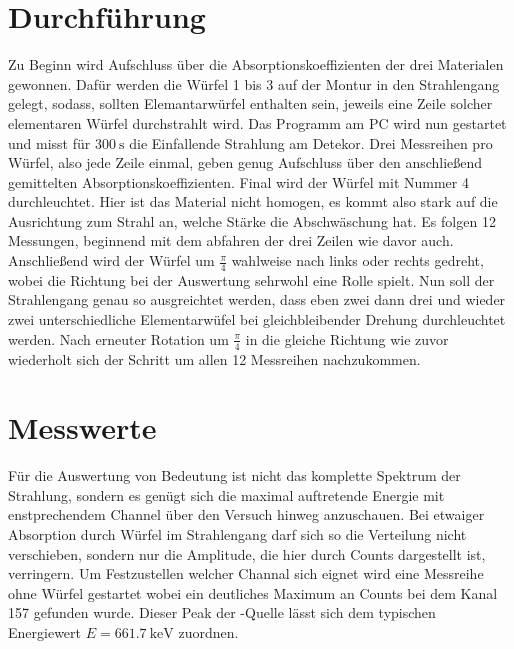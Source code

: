 \section{Durchführung}
Zu Beginn wird Aufschluss über die Absorptionskoeffizienten der drei Materialen gewonnen. 
Dafür werden die Würfel 1 bis 3 auf der Montur in den Strahlengang gelegt, sodass, sollten Elemantarwürfel enthalten sein, jeweils eine Zeile solcher elementaren Würfel 
durchstrahlt wird. Das Programm am PC wird nun gestartet und misst für $\SI{300}{\second}$ die Einfallende Strahlung am Detekor. Drei Messreihen pro Würfel, also jede Zeile einmal, geben genug Aufschluss über den anschließend gemittelten Absorptionskoeffizienten.
Final wird der Würfel mit Nummer 4 durchleuchtet. Hier ist das Material nicht homogen, es kommt also stark auf die Ausrichtung zum Strahl an, welche Stärke
die Abschwäschung hat. Es folgen 12 Messungen, beginnend mit dem abfahren der drei Zeilen wie davor auch. Anschließend wird der Würfel um 
$\frac{\pi}{4}$ wahlweise nach links oder rechts gedreht, wobei die Richtung bei der Auswertung sehrwohl eine Rolle spielt.
Nun soll der Strahlengang genau so ausgreichtet werden, dass eben zwei dann drei und wieder zwei unterschiedliche Elementarwüfel bei gleichbleibender Drehung
durchleuchtet werden. Nach erneuter Rotation um $\frac{\pi}{4}$ in die gleiche Richtung wie zuvor wiederholt sich der Schritt um 
allen 12 Messreihen nachzukommen.

\section{Messwerte}
Für die Auswertung von Bedeutung ist nicht das komplette Spektrum der Strahlung, sondern es genügt sich die maximal auftretende Energie mit enstprechendem
Channel über den Versuch hinweg anzuschauen. Bei etwaiger Absorption durch Würfel im Strahlengang darf sich so die Verteilung nicht verschieben, sondern 
nur die Amplitude, die hier durch Counts dargestellt ist, verringern.
Um Festzustellen welcher Channal sich eignet wird eine Messreihe ohne Würfel gestartet wobei ein deutliches Maximum an Counts bei dem Kanal 157 gefunden wurde. Dieser Peak der -Quelle lässt sich dem typischen Energiewert
$E = \SI{661.7}{\kilo\electronvolt}$ zuordnen.


